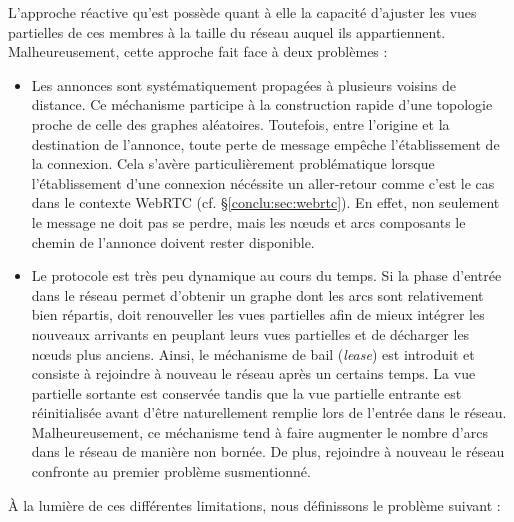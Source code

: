 L'approche réactive qu'est \SCAMP possède quant à elle la capacité d'ajuster les
vues partielles de ces membres à la taille du réseau auquel ils
appartiennent. Malheureusement, cette approche fait face à deux problèmes :
\begin{itemize}
\item Les annonces sont systématiquement propagées à plusieurs voisins de
  distance. Ce méchanisme participe à la construction rapide d'une topologie
  proche de celle des graphes aléatoires. Toutefois, entre l'origine et la
  destination de l'annonce, toute perte de message empêche l'établissement de la
  connexion. Cela s'avère particulièrement problématique lorsque l'établissement
  d'une connexion nécéssite un aller-retour comme c'est le cas dans le contexte
  WebRTC (cf. §\ref{conclu:sec:webrtc}). En effet, non seulement le message ne
  doit pas se perdre, mais les nœuds et arcs composants le chemin de l'annonce
  doivent rester disponible.
\item Le protocole est très peu dynamique au cours du temps. Si la phase
  d'entrée dans le réseau permet d'obtenir un graphe dont les arcs sont
  relativement bien répartis, \SCAMP doit renouveller les vues partielles afin
  de mieux intégrer les nouveaux arrivants en peuplant leurs vues partielles et
  de décharger les nœuds plus anciens. Ainsi, le méchanisme de bail
  (\emph{lease}) est introduit et consiste à rejoindre à nouveau le réseau après
  un certains temps. La vue partielle sortante est conservée tandis que la vue
  partielle entrante est réinitialisée avant d'être naturellement remplie lors
  de l'entrée dans le réseau. Malheureusement, ce méchanisme tend à faire
  augmenter le nombre d'arcs dans le réseau de manière non bornée. De plus,
  rejoindre à nouveau le réseau confronte au premier problème susmentionné.
\end{itemize}
À la lumière de ces différentes limitations, nous définissons le problème
suivant :

